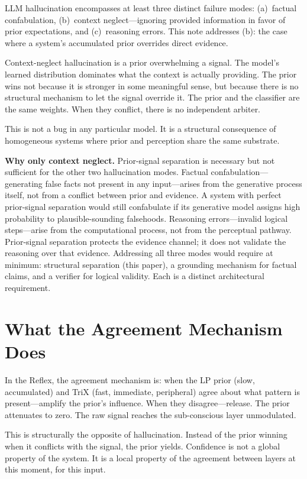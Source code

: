 \documentclass[11pt,letterpaper]{article}
\begin{document}
LLM hallucination encompasses at least three distinct failure modes: (a)~factual confabulation, (b)~context neglect---ignoring provided information in favor of prior expectations, and (c)~reasoning errors. This note addresses (b): the case where a system's accumulated prior overrides direct evidence.

Context-neglect hallucination is a prior overwhelming a signal. The model's learned distribution dominates what the context is actually providing. The prior wins not because it is stronger in some meaningful sense, but because there is no structural mechanism to let the signal override it. The prior and the classifier are the same weights. When they conflict, there is no independent arbiter.

This is not a bug in any particular model. It is a structural consequence of homogeneous systems where prior and perception share the same substrate.

\textbf{Why only context neglect.} Prior-signal separation is necessary but not sufficient for the other two hallucination modes. Factual confabulation---generating false facts not present in any input---arises from the generative process itself, not from a conflict between prior and evidence. A system with perfect prior-signal separation would still confabulate if its generative model assigns high probability to plausible-sounding falsehoods. Reasoning errors---invalid logical steps---arise from the computational process, not from the perceptual pathway. Prior-signal separation protects the evidence channel; it does not validate the reasoning over that evidence. Addressing all three modes would require at minimum: structural separation (this paper), a grounding mechanism for factual claims, and a verifier for logical validity. Each is a distinct architectural requirement.

\section{What the Agreement Mechanism Does}

In the Reflex, the agreement mechanism is: when the LP prior (slow, accumulated) and TriX (fast, immediate, peripheral) agree about what pattern is present---amplify the prior's influence. When they disagree---release. The prior attenuates to zero. The raw signal reaches the sub-conscious layer unmodulated.

This is structurally the opposite of hallucination. Instead of the prior winning when it conflicts with the signal, the prior yields. Confidence is not a global property of the system. It is a local property of the agreement between layers at this moment, for this input.
\end{document}
